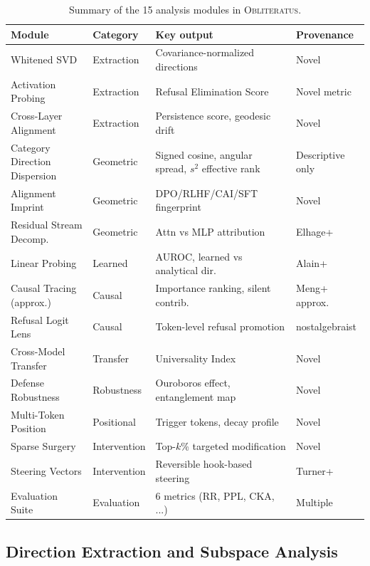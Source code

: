 \documentclass[11pt]{article}
\begin{document}
\begin{table}[t]
\centering
\caption{Summary of the 15 analysis modules in \textsc{Obliteratus}.}
\label{tab:modules}
\small
\begin{tabular}{@{}llll@{}}
\toprule
\textbf{Module} & \textbf{Category} & \textbf{Key output} & \textbf{Provenance} \\
\midrule
Whitened SVD & Extraction & Covariance-normalized directions & Novel \\
Activation Probing & Extraction & Refusal Elimination Score & Novel metric \\
Cross-Layer Alignment & Extraction & Persistence score, geodesic drift & Novel \\
\midrule
Category Direction Dispersion & Geometric & Signed cosine, angular spread, $s^2$ effective rank & Descriptive only \\
Alignment Imprint & Geometric & DPO/RLHF/CAI/SFT fingerprint & Novel \\
Residual Stream Decomp. & Geometric & Attn vs MLP attribution & Elhage+ \\
\midrule
Linear Probing & Learned & AUROC, learned vs analytical dir. & Alain+ \\
Causal Tracing (approx.) & Causal & Importance ranking, silent contrib. & Meng+ approx. \\
Refusal Logit Lens & Causal & Token-level refusal promotion & nostalgebraist \\
\midrule
Cross-Model Transfer & Transfer & Universality Index & Novel \\
Defense Robustness & Robustness & Ouroboros effect, entanglement map & Novel \\
Multi-Token Position & Positional & Trigger tokens, decay profile & Novel \\
\midrule
Sparse Surgery & Intervention & Top-$k$\% targeted modification & Novel \\
Steering Vectors & Intervention & Reversible hook-based steering & Turner+ \\
\midrule
Evaluation Suite & Evaluation & 6 metrics (RR, PPL, CKA, ...) & Multiple \\
\bottomrule
\end{tabular}
\end{table}

\subsection{Direction Extraction and Subspace Analysis}
\end{document}

